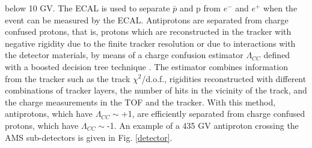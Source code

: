 \documentclass[twocolumn,twoside,slac_two]{revtex4-1}
\begin{document}
below 10 GV. The ECAL is used to separate $\bar{p}$ and p from $e^-$ and $e^+$
when the event can be measured by the ECAL.
Antiprotons are separated from charge confused protons,
that is, protons which are reconstructed in the tracker
with negative rigidity due to the finite tracker resolution or
due to interactions with the detector materials, by means of a charge
confusion estimator $\Lambda_{CC}$ defined with a boosted
decision tree technique \cite{BDT}. The estimator combines
information from the tracker such as the track $\chi^2$/d.o.f.,
rigidities reconstructed with different combinations of
tracker layers, the number of hits in the vicinity of the
track, and the charge measurements in the TOF and the
tracker. With this method, antiprotons, which have
$\Lambda_{CC}\sim$+1, are efficiently separated from charge confused
protons, which have $\Lambda_{CC}\sim$-1.
An example of a 435 GV antiproton crossing the AMS sub-detectors
is given in Fig. \ref{detector}.
\end{document}
